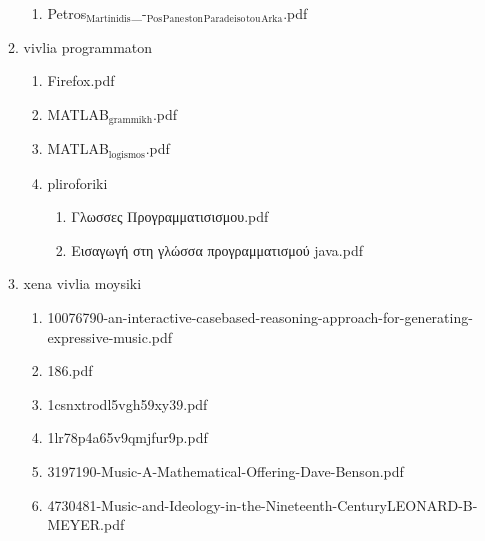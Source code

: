 \documentclass[11pt]{article}
\begin{document}
\begin{enumerate}
\begin{enumerate}
\begin{enumerate}
\item Petros$_{\text{Martinidis}}$\_-$_{\text{Pos}}$$_{\text{Pane}}$$_{\text{ston}}$$_{\text{Paradeiso}}$$_{\text{tou}}$$_{\text{Arka}}$.pdf
\label{sec-1-1-1-1-49-2-2-1-81-2}
\end{enumerate}

\item vivlia programmaton
\label{sec-1-1-1-1-49-2-2-1-82}
\begin{enumerate}
\item Firefox.pdf
\label{sec-1-1-1-1-49-2-2-1-82-1}

\item MATLAB$_{\text{grammikh}}$.pdf
\label{sec-1-1-1-1-49-2-2-1-82-2}

\item MATLAB$_{\text{logismos}}$.pdf
\label{sec-1-1-1-1-49-2-2-1-82-3}

\item pliroforiki
\label{sec-1-1-1-1-49-2-2-1-82-4}
\begin{enumerate}
\item Γλωσσες Προγραμματισισμου.pdf
\label{sec-1-1-1-1-49-2-2-1-82-4-1}

\item Εισαγωγή στη γλώσσα προγραμματισμού java.pdf
\label{sec-1-1-1-1-49-2-2-1-82-4-2}
\end{enumerate}
\end{enumerate}

\item xena vivlia moysiki
\label{sec-1-1-1-1-49-2-2-1-83}
\begin{enumerate}
\item 10076790-an-interactive-casebased-reasoning-approach-for-generating-expressive-music.pdf
\label{sec-1-1-1-1-49-2-2-1-83-1}

\item 186.pdf
\label{sec-1-1-1-1-49-2-2-1-83-2}

\item 1csnxtrodl5vgh59xy39.pdf
\label{sec-1-1-1-1-49-2-2-1-83-3}

\item 1lr78p4a65v9qmjfur9p.pdf
\label{sec-1-1-1-1-49-2-2-1-83-4}

\item 3197190-Music-A-Mathematical-Offering-Dave-Benson.pdf
\label{sec-1-1-1-1-49-2-2-1-83-5}

\item 4730481-Music-and-Ideology-in-the-Nineteenth-CenturyLEONARD-B-MEYER.pdf
\label{sec-1-1-1-1-49-2-2-1-83-6}


\end{enumerate}
\end{enumerate}
\end{enumerate}
\end{document}
